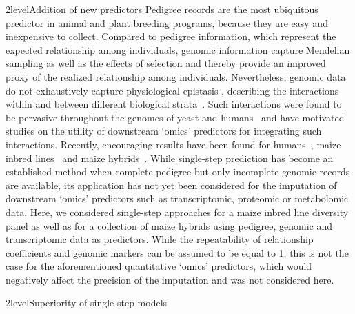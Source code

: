 \documentclass[12pt,titlepage]{article}
\begin{document}
\Genetics2level{Addition of new predictors}
Pedigree records are the most ubiquitous predictor in animal and plant breeding
programs, because they are easy and inexpensive to collect.
Compared to pedigree information, which represent the expected relationship
among individuals, genomic information capture Mendelian sampling as well as the
effects of selection and thereby provide an improved proxy of the realized
relationship among individuals.
Nevertheless, genomic data do not exhaustively capture physiological epistasis 
\cite{Jiang2015,Guo2016,Vazquez2016}, describing the interactions 
within and between different biological strata~\cite{Sackton2016}.
Such interactions were found to be pervasive throughout the genomes of yeast 
\cite{Brem2005} and humans~\cite{Brown2014} and have motivated studies on the 
utility of downstream `omics' predictors for integrating such interactions.
Recently, encouraging results have been found for humans~\cite{Vazquez2016}, 
maize inbred lines~\cite{Guo2016} and maize hybrids~\cite{Westhues2017}.
While single-step prediction has become an established method when complete
pedigree but only incomplete genomic records are available, its application has
not yet been considered for the imputation of downstream `omics' predictors
such as transcriptomic, proteomic or metabolomic data.
Here, we considered single-step approaches for a maize inbred line diversity
panel as well as for a collection of maize hybrids using pedigree, genomic and
transcriptomic data as predictors.
While the repeatability of relationship coefficients and genomic markers can be
assumed to be equal to 1, this is not the case for the aforementioned
quantitative `omics' predictors, which would negatively affect the precision of
the imputation and was not considered here.


\Genetics2level{Superiority of single-step models}
\end{document}
